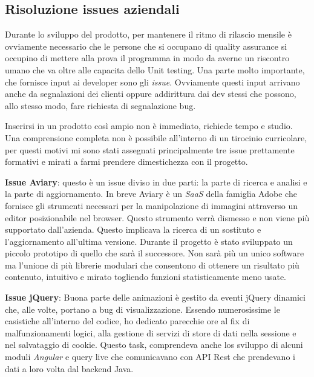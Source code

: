 \documentclass[a4paper]{article}
\begin{document}
\subsection{Risoluzione issues aziendali}
\par Durante lo sviluppo del prodotto, per mantenere il ritmo di rilascio mensile è 
ovviamente necessario che le persone che si occupano di quality assurance si occupino 
di mettere alla prova il programma in modo da averne un riscontro umano che va oltre
alle capacita dello Unit testing. Una parte molto importante, che fornisce input
ai developer sono gli \emph{issue}. Ovviamente questi input arrivano anche da segnalazioni
dei clienti oppure addirittura dai dev stessi che possono, allo stesso modo, fare richiesta
di segnalazione bug.\\
\par Inserirsi in un prodotto così ampio non è immediato, richiede tempo e studio.
Una comprensione completa non è possibile all'interno di un tirocinio curricolare, per
questi motivi mi sono stati assegnati principalmente tre issue prettamente formativi 
e mirati a farmi prendere dimestichezza con il progetto.
\par \textbf{Issue Aviary}: questo è un issue diviso in due parti: la parte di ricerca 
e analisi e la parte di aggiornamento. In breve Aviary è un \emph{SaaS} della famiglia
Adobe che fornisce gli strumenti necessari per la manipolazione di immagini attraverso
un editor posizionabile nel browser. Questo strumento verrà dismesso e non viene più
supportato dall'azienda. Questo implicava la ricerca di un sostituto e l'aggiornamento all'ultima versione.
Durante il progetto è stato sviluppato un piccolo prototipo di quello che sarà il successore.
Non sarà più un unico software ma l'unione di più librerie modulari che consentono di
ottenere un risultato più contenuto, intuitivo e mirato togliendo funzioni statisticamente
meno usate.\\
\par \textbf{Issue jQuery}: Buona parte delle animazioni è gestito da eventi jQuery 
dinamici che, alle volte, portano a bug di visualizzazione. Essendo numerosissime
le casistiche all'interno del codice, ho dedicato parecchie ore al fix di malfunzionamenti
logici, alla gestione di servizi di store di dati nella sessione e nel salvataggio di cookie.
Questo task, comprendeva anche los sviluppo di alcuni moduli \emph{Angular} e query live
che comunicavano con API Rest che prendevano i dati a loro volta dal backend Java.\\
\end{document}
